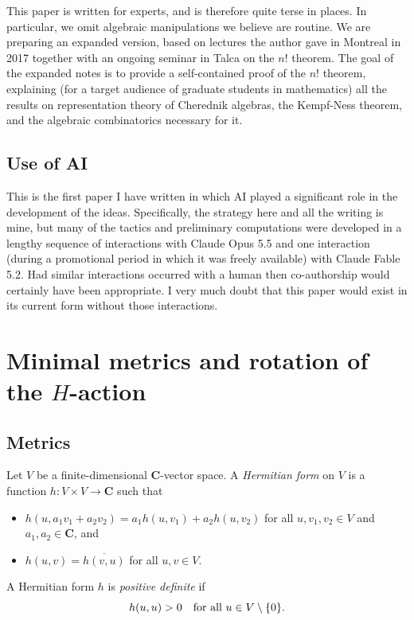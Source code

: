 \documentclass[12pt, reqno]{amsart}
\numberwithin{equation}{section}
\theoremstyle{definition}
\theoremstyle{plain}
\newcommand{\CC}{\mathbf{C}}
\begin{document}
This paper is written for experts, and is therefore quite terse in places. In particular, we omit algebraic manipulations we believe are routine. We are preparing an expanded version, based on lectures the author gave in Montreal in 2017 together with an ongoing seminar in Talca on the $n!$ theorem. The goal of the expanded notes is to provide a self-contained proof of the $n!$ theorem, explaining (for a target audience of graduate students in mathematics) all the results on representation theory of Cherednik algebras, the Kempf-Ness theorem, and the algebraic combinatorics necessary for it.

\subsection{Use of AI}

This is the first paper I have written in which AI played a significant role in the development of the ideas. Specifically, the strategy here and all the writing is mine, but many of the tactics and preliminary computations were developed in a lengthy sequence of interactions with Claude Opus 5.5 and one interaction (during a promotional period in which it was freely available) with Claude Fable 5.2. Had similar interactions occurred with a human then co-authorship would certainly have been appropriate. I very much doubt that this paper would exist in its current form without those interactions.

\section{Minimal metrics and rotation of the $H$-action}

\subsection{Metrics} Let $V$ be a finite-dimensional $\CC$-vector space. A \emph{Hermitian form} on $V$ is a function $h:V \times V \to \CC$ such that
\begin{itemize}
\item[(a)] $h(u,a_1 v_1+a_2 v_2)=a_1 h(u, v_1)+a_2h(u,v_2)$ for all $u,v_1,v_2 \in V$ and $a_1,a_2 \in \CC$, and
\item[(b)] $h(u,v)=\overline{h(v,u)}$ for all $u,v \in V$.
\end{itemize} A Hermitian form $h$ is \emph{positive definite} if 
$$h(u,u) > 0 \quad \hbox{for all $u \in V \setminus \{ 0 \}$.}$$
\end{document}
